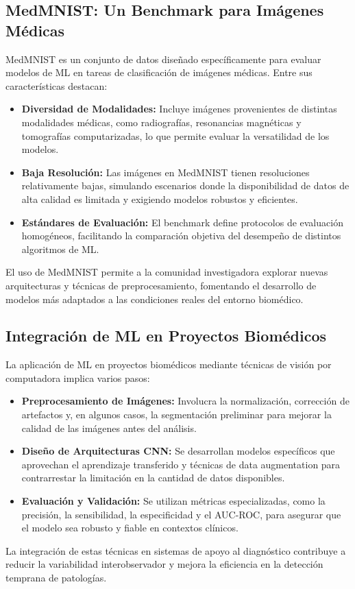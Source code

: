 \documentclass[11pt,spanish,listoffigures,listoftables]{tfgetsinf}
\begin{document}
\subsection{MedMNIST: Un Benchmark para Imágenes Médicas}
MedMNIST es un conjunto de datos diseñado específicamente para evaluar modelos de ML en tareas de clasificación de imágenes médicas. Entre sus características destacan:
\begin{itemize}
    \item \textbf{Diversidad de Modalidades:} Incluye imágenes provenientes de distintas modalidades médicas, como radiografías, resonancias magnéticas y tomografías computarizadas, lo que permite evaluar la versatilidad de los modelos.
    \item \textbf{Baja Resolución:} Las imágenes en MedMNIST tienen resoluciones relativamente bajas, simulando escenarios donde la disponibilidad de datos de alta calidad es limitada y exigiendo modelos robustos y eficientes.
    \item \textbf{Estándares de Evaluación:} El benchmark define protocolos de evaluación homogéneos, facilitando la comparación objetiva del desempeño de distintos algoritmos de ML.
\end{itemize}
El uso de MedMNIST permite a la comunidad investigadora explorar nuevas arquitecturas y técnicas de preprocesamiento, fomentando el desarrollo de modelos más adaptados a las condiciones reales del entorno biomédico.

\subsection{Integración de ML en Proyectos Biomédicos}
La aplicación de ML en proyectos biomédicos mediante técnicas de visión por computadora implica varios pasos:
\begin{itemize}
    \item \textbf{Preprocesamiento de Imágenes:} Involucra la normalización, corrección de artefactos y, en algunos casos, la segmentación preliminar para mejorar la calidad de las imágenes antes del análisis.
    \item \textbf{Diseño de Arquitecturas CNN:} Se desarrollan modelos específicos que aprovechan el aprendizaje transferido y técnicas de data augmentation para contrarrestar la limitación en la cantidad de datos disponibles.
    \item \textbf{Evaluación y Validación:} Se utilizan métricas especializadas, como la precisión, la sensibilidad, la especificidad y el AUC-ROC, para asegurar que el modelo sea robusto y fiable en contextos clínicos.
\end{itemize}
La integración de estas técnicas en sistemas de apoyo al diagnóstico contribuye a reducir la variabilidad interobservador y mejora la eficiencia en la detección temprana de patologías.
\end{document}
